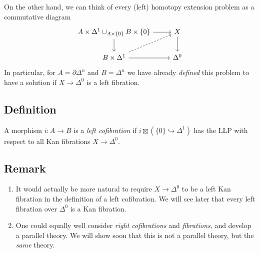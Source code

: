         On the other hand, we can think of every (left) homotopy extension problem as a commutative diagram
        \begin{equation*}
            \begin{tikzcd}
                A \times \Delta^1 \cup_{A \times \{0\}} B \times \{0\} \arrow[r] \arrow[d] & X \arrow[d] \\
                B \times \Delta^1 \arrow[ur, dashed] \arrow[r] & \Delta^0
            \end{tikzcd}
        \end{equation*}
        In particular, for $A = \partial \Delta^n$ and $B = \Delta^n$ we have already \emph{defined} this problem to have a solution if $X \to \Delta^0$ is a left fibration.

    \subsection{Definition}
        A morphism $i \colon A \to B$ is a \emph{left cofibration} if $i \boxtimes (\{0\} \hookrightarrow \Delta^1)$ has the LLP with respect to all Kan fibrations $X \to \Delta^0$.

    \subsection{Remark}\label{chV-1-6}
        \begin{enumerate}[label=\roman*)]
            \item 
                It would actually be more natural to require $X \to \Delta^0$ to be a left Kan fibration in the definition of a left cofibration. We will see later that every left fibration over $\Delta^0$ is a Kan fibration.
            \item 
                One could equally well consider \emph{right cofibrations} and \emph{fibrations}, and develop a parallel theory. We will show soon that this is not a parallel theory, but the \emph{same} theory.
        \end{enumerate}

